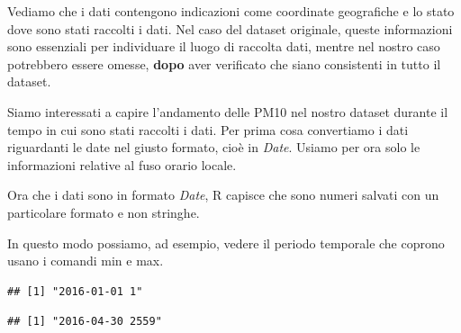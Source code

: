 \documentclass[]{book}
\newenvironment{Shaded}{\begin{snugshade}}{\end{snugshade}}
\newcommand{\KeywordTok}[1]{\textcolor[rgb]{0.13,0.29,0.53}{\textbf{#1}}}
\newcommand{\NormalTok}[1]{#1}
\newcommand{\OperatorTok}[1]{\textcolor[rgb]{0.81,0.36,0.00}{\textbf{#1}}}
\newcommand{\StringTok}[1]{\textcolor[rgb]{0.31,0.60,0.02}{#1}}
\begin{document}
Vediamo che i dati contengono indicazioni come coordinate geografiche e lo stato dove sono stati raccolti i dati. Nel caso del dataset originale, queste informazioni sono essenziali per individuare il luogo di raccolta dati, mentre nel nostro caso potrebbero essere omesse, \textbf{dopo} aver verificato che siano consistenti in tutto il dataset.

Siamo interessati a capire l'andamento delle PM10 nel nostro dataset durante il tempo in cui sono stati raccolti i dati. Per prima cosa convertiamo i dati riguardanti le date nel giusto formato, cioè in \emph{Date}. Usiamo per ora solo le informazioni relative al fuso orario locale.

\begin{Shaded}
\end{Shaded}

Ora che i dati sono in formato \emph{Date}, R capisce che sono numeri salvati con un particolare formato e non stringhe.

In questo modo possiamo, ad esempio, vedere il periodo temporale che coprono usano i comandi min e max.

\begin{Shaded}
\end{Shaded}

\begin{verbatim}
## [1] "2016-01-01 1"
\end{verbatim}

\begin{Shaded}
\end{Shaded}

\begin{verbatim}
## [1] "2016-04-30 2559"
\end{verbatim}
\end{document}
